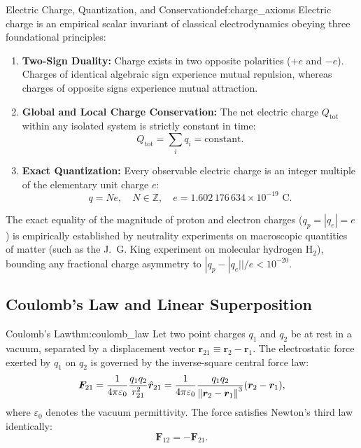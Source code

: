 \begin{definition}{Electric Charge, Quantization, and Conservation}{def:charge_axioms}
Electric charge is an empirical scalar invariant of classical electrodynamics obeying three foundational principles:
\begin{enumerate}
    \item \textbf{Two-Sign Duality:} Charge exists in two opposite polarities ($+e$ and $-e$). Charges of identical algebraic sign experience mutual repulsion, whereas charges of opposite signs experience mutual attraction.
    \item \textbf{Global and Local Charge Conservation:} The net electric charge $Q_{\text{tot}}$ within any isolated system is strictly constant in time:
    \begin{equation}
        Q_{\text{tot}} = \sum_{i} q_i = \text{constant}.
    \end{equation}
    \item \textbf{Exact Quantization:} Every observable electric charge is an integer multiple of the elementary unit charge $e$:
    \begin{equation}
        q = N e, \quad N \in \mathbb{Z}, \quad e = 1.602\,176\,634 \times 10^{-19} \text{ C}.
    \end{equation}
\end{enumerate}
\end{definition}

\begin{remark}
The exact equality of the magnitude of proton and electron charges ($q_p = |q_e| = e$) is empirically established by neutrality experiments on macroscopic quantities of matter (such as the J.~G. King experiment on molecular hydrogen $\mathrm{H}_2$), bounding any fractional charge asymmetry to $|q_p - |q_e|| / e < 10^{-20}$.
\end{remark}

\subsection[Coulomb's Law and Linear Superposition]{Coulomb's Law and Linear Superposition}

\begin{theorem}{Coulomb's Law}{thm:coulomb_law}
Let two point charges $q_1$ and $q_2$ be at rest in a vacuum, separated by a displacement vector $\bm{r}_{21} \equiv \bm{r}_2 - \bm{r}_1$. The electrostatic force exerted by $q_1$ on $q_2$ is governed by the inverse-square central force law:
\begin{equation}
    \bm{F}_{21} = \frac{1}{4\pi\varepsilon_0} \frac{q_1 q_2}{r_{21}^2} \hat{\bm{r}}_{21} = \frac{1}{4\pi\varepsilon_0} \frac{q_1 q_2}{\norm{\bm{r}_2 - \bm{r}_1}^3} (\bm{r}_2 - \bm{r}_1),
\end{equation}
where $\varepsilon_0$ denotes the vacuum permittivity. The force satisfies Newton's third law identically:
\begin{equation}
    \bm{F}_{12} = -\bm{F}_{21}.
\end{equation}
\end{theorem}

